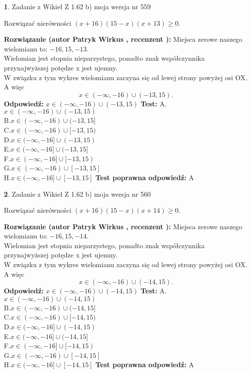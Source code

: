 \documentclass[12pt, a4paper]{article}
\theoremstyle{definition} %
\newtheorem{zad}{}
\newcommand{\zadStart}[1]{\begin{zad}#1\newline}
\newcommand{\zadStop}{\end{zad}}
\newcommand{\rozwStart}[2]{\noindent \textbf{Rozwiązanie (autor #1 , recenzent #2): }\newline}
\newcommand{\rozwStop}{\newline}
\newcommand{\odpStart}{\noindent \textbf{Odpowiedź:}\newline}
\newcommand{\odpStop}{\newline}
\newcommand{\testStart}{\noindent \textbf{Test:}\newline}
\newcommand{\testStop}{\newline}
\newcommand{\kluczStart}{\noindent \textbf{Test poprawna odpowiedź:}\newline}
\newcommand{\kluczStop}{\newline}
\begin{document}
\zadStart{Zadanie z Wikieł Z 1.62 b) moja wersja nr 559}

Rozwiązać nierówności $(x+16)(15-x)(x+13)\ge0$.
\zadStop
\rozwStart{Patryk Wirkus}{}
Miejsca zerowe naszego wielomianu to: $-16, 15, -13$.\\
Wielomian jest stopnia nieparzystego, ponadto znak współczynnika przy\linebreak najwyższej potędze x jest ujemny.\\ W związku z tym wykres wielomianu zaczyna się od lewej strony powyżej osi OX. A więc $$x \in (-\infty,-16) \cup (-13,15).$$
\rozwStop
\odpStart
$x \in (-\infty,-16) \cup (-13,15)$
\odpStop
\testStart
A.$x \in (-\infty,-16) \cup (-13,15)$\\
B.$x \in (-\infty,-16) \cup (-13,15]$\\
C.$x \in (-\infty,-16) \cup [-13,15)$\\
D.$x \in (-\infty,-16] \cup (-13,15)$\\
E.$x \in (-\infty,-16] \cup (-13,15]$\\
F.$x \in (-\infty,-16] \cup [-13,15)$\\
G.$x \in (-\infty,-16) \cup [-13,15]$\\
H.$x \in (-\infty,-16] \cup [-13,15]$
\testStop
\kluczStart
A
\kluczStop



\zadStart{Zadanie z Wikieł Z 1.62 b) moja wersja nr 560}

Rozwiązać nierówności $(x+16)(15-x)(x+14)\ge0$.
\zadStop
\rozwStart{Patryk Wirkus}{}
Miejsca zerowe naszego wielomianu to: $-16, 15, -14$.\\
Wielomian jest stopnia nieparzystego, ponadto znak współczynnika przy\linebreak najwyższej potędze x jest ujemny.\\ W związku z tym wykres wielomianu zaczyna się od lewej strony powyżej osi OX. A więc $$x \in (-\infty,-16) \cup (-14,15).$$
\rozwStop
\odpStart
$x \in (-\infty,-16) \cup (-14,15)$
\odpStop
\testStart
A.$x \in (-\infty,-16) \cup (-14,15)$\\
B.$x \in (-\infty,-16) \cup (-14,15]$\\
C.$x \in (-\infty,-16) \cup [-14,15)$\\
D.$x \in (-\infty,-16] \cup (-14,15)$\\
E.$x \in (-\infty,-16] \cup (-14,15]$\\
F.$x \in (-\infty,-16] \cup [-14,15)$\\
G.$x \in (-\infty,-16) \cup [-14,15]$\\
H.$x \in (-\infty,-16] \cup [-14,15]$
\testStop
\kluczStart
A
\kluczStop
\end{document}
